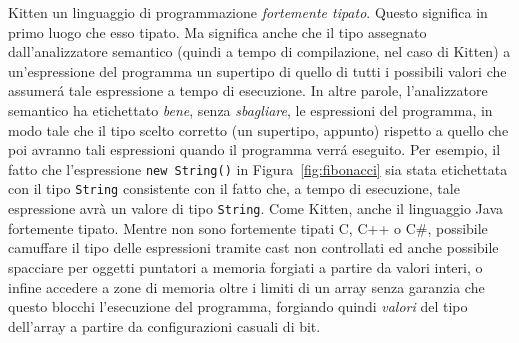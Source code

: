 Kitten \e un linguaggio di programmazione \emph{fortemente tipato}.
Questo significa in primo luogo che esso \e tipato. Ma significa
anche che il tipo assegnato dall'analizzatore semantico
(quindi a tempo di compilazione, nel caso di Kitten)
a un'espressione del programma
\e un supertipo di quello di tutti i possibili valori che assumer\'a
tale espressione a tempo
di esecuzione. In altre parole, l'analizzatore semantico ha etichettato
\emph{bene}, senza \emph{sbagliare},
le espressioni del programma, in modo tale che il tipo scelto
\e corretto (un supertipo, appunto)
rispetto a quello che poi avranno tali espressioni quando il programma verr\'a eseguito.
Per esempio, il fatto che l'espressione \texttt{new String()} in
Figura~\ref{fig:fibonacci} sia stata etichettata con il tipo \texttt{String}
\e consistente con il fatto che, a tempo di esecuzione, tale espressione
avr\`a un valore di tipo \texttt{String}. Come Kitten,
anche il linguaggio Java \e
fortemente tipato. Mentre non sono fortemente tipati C, C++ o C\#, \poiche
\e possibile camuffare il tipo delle espressioni tramite cast non
controllati ed \e anche possibile spacciare per oggetti puntatori a memoria
forgiati a partire da valori interi, o infine accedere a zone di memoria
oltre i limiti di un array senza garanzia che questo blocchi l'esecuzione
del programma, forgiando quindi \emph{valori} del tipo dell'array
a partire da configurazioni casuali di bit.

